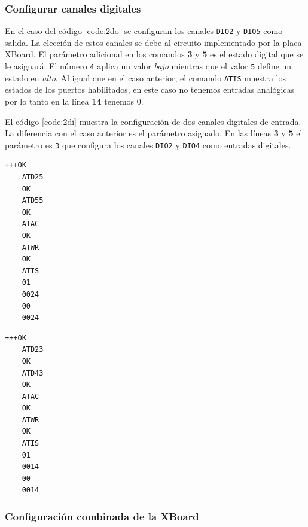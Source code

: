 \documentclass[11pt,oneside,spanish,a4paper]{article}
\begin{document}
\subsubsection{Configurar canales digitales}
En el caso del código \ref{code:2do} se configuran los canales
\texttt{DIO2} y \texttt{DIO5} como salida. La elección de estos
canales se debe al circuito implementado por la placa XBoard. El
parámetro adicional en los comandos \textbf{3} y \textbf{5} es el
estado digital que se le asignará. El número \texttt{4} aplica un
valor \emph{bajo} mientras que el valor \texttt{5} define un estado
en \emph{alto}.  Al igual que en el caso anterior, el comando
\texttt{ATIS} muestra los estados de los puertos habilitados, en este
caso no tenemos entradas analógicas por lo tanto en la línea
\textbf{14} tenemos 0. 

El código \ref{code:2di}  muestra la configuración de dos canales
digitales de entrada. La diferencia con el caso anterior es el
parámetro asignado. En las líneas \textbf{3} y \textbf{5} el parámetro
es \texttt{3} que configura los canales \texttt{DIO2} y \texttt{DIO4}
como entradas digitales. 

\noindent\begin{minipage}{.45\textwidth}
\begin{lstlisting}[emph={+++,ATIS,ATD25,ATD55,ATWR,ATAC},
    emphstyle={\color{blue}}, caption={Dos salidas
      en alto.}, label=code:2do]
    +++OK
    ATD25
    OK
    ATD55
    OK
    ATAC
    OK
    ATWR
    OK
    ATIS
    01
    0024
    00
    0024
\end{lstlisting}  
\end{minipage}\hfill
\begin{minipage}{.45\textwidth}
\begin{lstlisting}[emph={+++,ATIS,ATD23,ATD43,ATWR,ATAC},
    emphstyle={\color{blue}}, caption={Dos entradas},
 label=code:2di]
    +++OK
    ATD23
    OK
    ATD43
    OK
    ATAC
    OK  
    ATWR
    OK
    ATIS
    01
    0014
    00
    0014
\end{lstlisting}  
\end{minipage}

\subsubsection{Configuración combinada de la XBoard}
\end{document}
